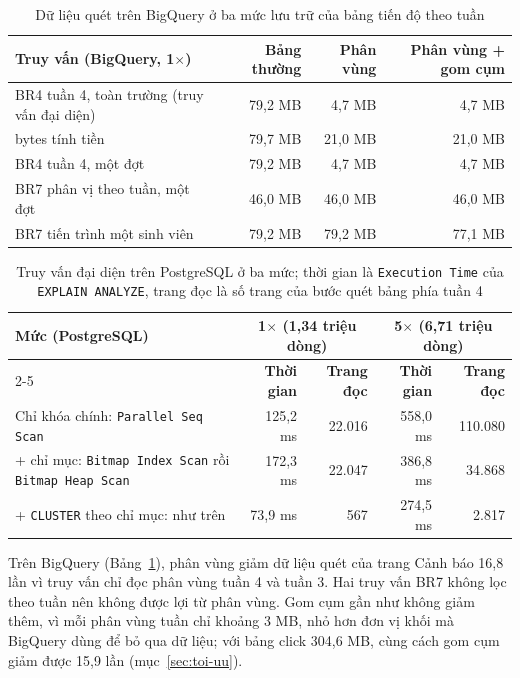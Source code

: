 \begin{table}[htbp]
\centering
\small
\begin{tabularx}{\textwidth}{|X|r|r|r|}
\hline
\textbf{Truy vấn (BigQuery, 1$\times$)} & \textbf{Bảng thường} & \textbf{Phân vùng} & \textbf{Phân vùng + gom cụm} \\ \hline
BR4 tuần 4, toàn trường (truy vấn đại diện) & 79,2 MB & 4,7 MB & 4,7 MB \\ \hline
\quad bytes tính tiền & 79,7 MB & 21,0 MB & 21,0 MB \\ \hline
BR4 tuần 4, một đợt & 79,2 MB & 4,7 MB & 4,7 MB \\ \hline
BR7 phân vị theo tuần, một đợt & 46,0 MB & 46,0 MB & 46,0 MB \\ \hline
BR7 tiến trình một sinh viên & 79,2 MB & 79,2 MB & 77,1 MB \\ \hline
\end{tabularx}
\caption{Dữ liệu quét trên BigQuery ở ba mức lưu trữ của bảng tiến độ theo tuần}
\label{tab:chi-muc-bq}
\end{table}

\newpage

\begin{table}[htbp]
\centering
\small
\begin{tabularx}{\textwidth}{|X|r|r|r|r|}
\hline
\textbf{Mức (PostgreSQL)} & \multicolumn{2}{c|}{\textbf{1$\times$ (1,34 triệu dòng)}} & \multicolumn{2}{c|}{\textbf{5$\times$ (6,71 triệu dòng)}} \\ \cline{2-5}
& \textbf{Thời gian} & \textbf{Trang đọc} & \textbf{Thời gian} & \textbf{Trang đọc} \\ \hline
Chỉ khóa chính: \texttt{Parallel Seq Scan} & 125,2 ms & 22.016 & 558,0 ms & 110.080 \\ \hline
+ chỉ mục: \texttt{Bitmap Index Scan} rồi \texttt{Bitmap Heap Scan} & 172,3 ms & 22.047 & 386,8 ms & 34.868 \\ \hline
+ \texttt{CLUSTER} theo chỉ mục: như trên & 73,9 ms & 567 & 274,5 ms & 2.817 \\ \hline
\end{tabularx}
\caption{Truy vấn đại diện trên PostgreSQL ở ba mức; thời gian là \texttt{Execution Time} của
\texttt{EXPLAIN ANALYZE}, trang đọc là số trang của bước quét bảng phía tuần 4}
\label{tab:chi-muc-pg}
\end{table}

Trên BigQuery (Bảng~\ref{tab:chi-muc-bq}), phân vùng giảm dữ liệu quét của trang Cảnh báo 16,8
lần vì truy vấn chỉ đọc phân vùng tuần 4 và tuần 3. Hai truy vấn BR7 không lọc theo tuần nên không
được lợi từ phân vùng. Gom cụm gần như không giảm thêm, vì mỗi phân vùng tuần chỉ khoảng 3 MB,
nhỏ hơn đơn vị khối mà BigQuery dùng để bỏ qua dữ liệu; với bảng click 304,6 MB, cùng cách gom
cụm giảm được 15,9 lần (mục~\ref{sec:toi-uu}).


